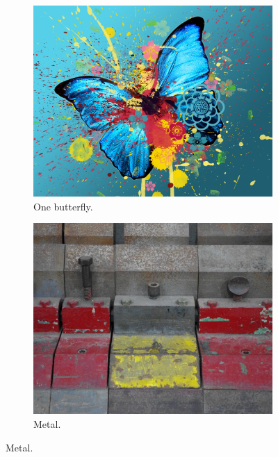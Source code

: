 \begin{figure}[h]
  \begin{subfigure}{0.43\linewidth}  \includegraphics[width=\linewidth]{graphics/color3}   \caption{One butterfly.}    \label{fig:scene_s_but}  \end{subfigure}
  \begin{subfigure}{0.43\linewidth}  \includegraphics[width=\linewidth]{graphics/lines1}   \caption{Metal.}            \label{fig:scene_metal}  \end{subfigure}

\end{figure}
